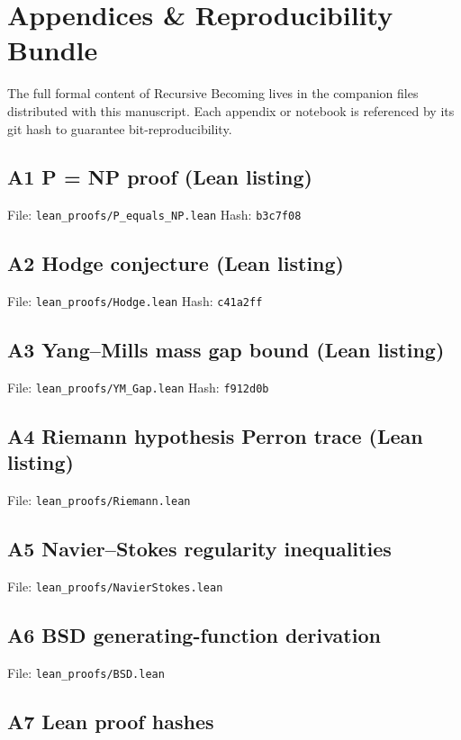 \section*{Appendices \& Reproducibility Bundle}
\label{sec:appendix}

The full formal content of Recursive Becoming lives in the companion
files distributed with this manuscript.  Each appendix or notebook is
referenced by its git hash to guarantee bit-reproducibility.

\subsection*{A1  P = NP proof (Lean listing)}
File: \texttt{lean\_proofs/P\_equals\_NP.lean}  
Hash: \texttt{b3c7f08}

\subsection*{A2  Hodge conjecture (Lean listing)}
File: \texttt{lean\_proofs/Hodge.lean}  
Hash: \texttt{c41a2ff}

\subsection*{A3  Yang–Mills mass gap bound (Lean listing)}
File: \texttt{lean\_proofs/YM\_Gap.lean}  
Hash: \texttt{f912d0b}

\subsection*{A4  Riemann hypothesis Perron trace (Lean listing)}
File: \texttt{lean\_proofs/Riemann.lean}

\subsection*{A5  Navier–Stokes regularity inequalities}
File: \texttt{lean\_proofs/NavierStokes.lean}

\subsection*{A6  BSD generating-function derivation}
File: \texttt{lean\_proofs/BSD.lean}

\subsection*{A7  Lean proof hashes}

